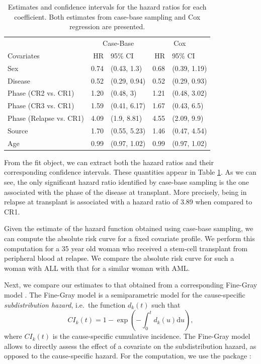 \begin{Schunk}
\begin{table}

\caption{\label{tab:bmtcrr-cis}Estimates and confidence intervals for the hazard ratios for each coefficient. Both estimates from case-base sampling and Cox regression are presented.}
\centering
\begin{tabular}[t]{lrlrl}
\toprule
\multicolumn{1}{c}{ } & \multicolumn{2}{c}{Case-Base} & \multicolumn{2}{c}{Cox} \\
\cmidrule(l{3pt}r{3pt}){2-3} \cmidrule(l{3pt}r{3pt}){4-5}
Covariates & HR & 95\% CI & HR & 95\% CI\\
\midrule
Sex & 0.74 & (0.43, 1.3) & 0.68 & (0.39, 1.19)\\
Disease & 0.52 & (0.29, 0.94) & 0.52 & (0.29, 0.93)\\
Phase (CR2 vs. CR1) & 1.20 & (0.48, 3) & 1.21 & (0.48, 3.02)\\
Phase (CR3 vs. CR1) & 1.59 & (0.41, 6.17) & 1.67 & (0.43, 6.5)\\
Phase (Relapse vs. CR1) & 4.09 & (1.9, 8.81) & 4.55 & (2.09, 9.9)\\
\addlinespace
Source & 1.70 & (0.55, 5.23) & 1.46 & (0.47, 4.54)\\
Age & 0.99 & (0.97, 1.02) & 0.99 & (0.97, 1.02)\\
\bottomrule
\end{tabular}
\end{table}

\end{Schunk}

From the fit object, we can extract both the hazard ratios and their
corresponding confidence intervals. These quantities appear in Table
\ref{tab:bmtcrr-cis}. As we can see, the only significant hazard ratio
identified by case-base sampling is the one associated with the phase of
the disease at transplant. More precisely, being in relapse at
transplant is associated with a hazard ratio of 3.89 when compared to
CR1.

Given the estimate of the hazard function obtained using case-base
sampling, we can compute the absolute risk curve for a fixed covariate
profile. We perform this computation for a 35 year old woman who
received a stem-cell transplant from peripheral blood at relapse. We
compare the absolute risk curve for such a woman with ALL with that for
a similar woman with AML.

Next, we compare our estimates to that obtained from a corresponding
Fine-Gray model \citeyearpar{fine1999proportional}. The Fine-Gray model
is a semiparametric model for the cause-specific \emph{subdistribution
hazard}, i.e.~the function \(d_k(t)\) such that
\[CI_k(t) =1 - \exp\left( - \int_0^t d_k(u) \textrm{d}u \right),\] where
\(CI_k(t)\) is the cause-specific cumulative incidence. The Fine-Gray
model allows to directly assess the effect of a covariate on the
subdistribution hazard, as opposed to the cause-specific hazard. For the
computation, we use the  package \citep{timereg}:

